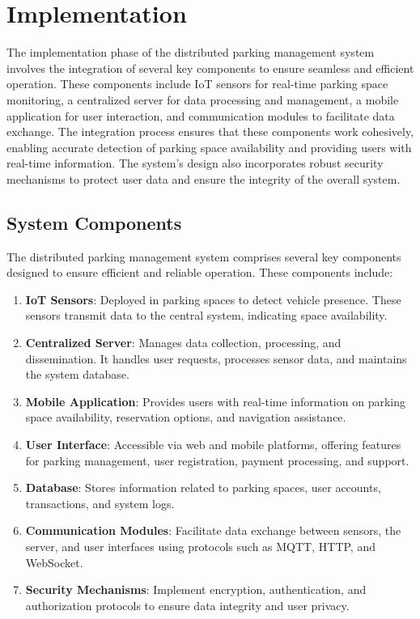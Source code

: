 \documentclass[oneside, 12pt, a4paper, draft]{book}
\begin{document}
\chapter{Implementation}
\label{sec:orgf77de49}
The implementation phase of the distributed parking management system involves the integration of several key components to ensure seamless and efficient operation. These components include IoT sensors for real-time parking space monitoring, a centralized server for data processing and management, a mobile application for user interaction, and communication modules to facilitate data exchange. The integration process ensures that these components work cohesively, enabling accurate detection of parking space availability and providing users with real-time information. The system's design also incorporates robust security mechanisms to protect user data and ensure the integrity of the overall system.
\section{System Components}
\label{sec:org973620b}
The distributed parking management system comprises several key components designed to ensure efficient and reliable operation. These components include:

\begin{enumerate}
\item \textbf{\textbf{IoT Sensors}}: Deployed in parking spaces to detect vehicle presence. These sensors transmit data to the central system, indicating space availability.
\item \textbf{\textbf{Centralized Server}}: Manages data collection, processing, and dissemination. It handles user requests, processes sensor data, and maintains the system database.
\item \textbf{\textbf{Mobile Application}}: Provides users with real-time information on parking space availability, reservation options, and navigation assistance.
\item \textbf{\textbf{User Interface}}: Accessible via web and mobile platforms, offering features for parking management, user registration, payment processing, and support.
\item \textbf{\textbf{Database}}: Stores information related to parking spaces, user accounts, transactions, and system logs.
\item \textbf{\textbf{Communication Modules}}: Facilitate data exchange between sensors, the server, and user interfaces using protocols such as MQTT, HTTP, and WebSocket.
\item \textbf{\textbf{Security Mechanisms}}: Implement encryption, authentication, and authorization protocols to ensure data integrity and user privacy.
\end{enumerate}
\end{document}
